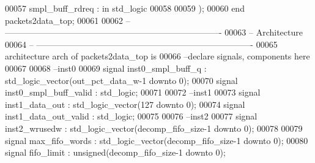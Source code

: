 \begin{DoxyCode}
00057       \textcolor{vhdlchar}{smpl_buff_rdreq}   \textcolor{vhdlchar}{:} \textcolor{keywordflow}{in} \textcolor{comment}{std\_logic}
00058       
00059         \textcolor{vhdlchar}{)};
00060 \textcolor{keywordflow}{end} \textcolor{vhdlchar}{packets2data\_top};
00061 
00062 \textcolor{keyword}{-- ----------------------------------------------------------------------------}
00063 \textcolor{keyword}{-- Architecture}
00064 \textcolor{keyword}{-- ----------------------------------------------------------------------------}
00065 \textcolor{keywordflow}{architecture} arch \textcolor{keywordflow}{of} packets2data_top is
00066 \textcolor{keyword}{--declare signals,  components here}
00067 
00068 \textcolor{keyword}{--inst0}
00069 \textcolor{keywordflow}{signal} \textcolor{vhdlchar}{inst0_smpl_buff_q}         \textcolor{vhdlchar}{:} \textcolor{comment}{std\_logic\_vector}\textcolor{vhdlchar}{(}\textcolor{vhdlchar}{out_pct_data_w}\textcolor{vhdlchar}{-}\textcolor{vhdllogic}{}\textcolor{vhdllogic}{1} \textcolor{keywordflow}{downto} \textcolor{vhdllogic}{}\textcolor{vhdllogic}{0}\textcolor{vhdlchar}{)}; 
00070 \textcolor{keywordflow}{signal} \textcolor{vhdlchar}{inst0_smpl_buff_valid}     \textcolor{vhdlchar}{:} \textcolor{comment}{std\_logic};
00071 
00072 \textcolor{keyword}{--inst1}
00073 \textcolor{keywordflow}{signal} \textcolor{vhdlchar}{inst1_data_out}            \textcolor{vhdlchar}{:} \textcolor{comment}{std\_logic\_vector}\textcolor{vhdlchar}{(}\textcolor{vhdllogic}{}\textcolor{vhdllogic}{127} \textcolor{keywordflow}{downto} \textcolor{vhdllogic}{}\textcolor{vhdllogic}{0}\textcolor{vhdlchar}{)};
00074 \textcolor{keywordflow}{signal} \textcolor{vhdlchar}{inst1_data_out_valid}      \textcolor{vhdlchar}{:} \textcolor{comment}{std\_logic};
00075 
00076 \textcolor{keyword}{--inst2}
00077 \textcolor{keywordflow}{signal} \textcolor{vhdlchar}{inst2_wrusedw}             \textcolor{vhdlchar}{:} \textcolor{comment}{std\_logic\_vector}\textcolor{vhdlchar}{(}\textcolor{vhdlchar}{decomp_fifo_size}\textcolor{vhdlchar}{-}\textcolor{vhdllogic}{}\textcolor{vhdllogic}{1} \textcolor{keywordflow}{downto} \textcolor{vhdllogic}{}\textcolor{vhdllogic}{0}\textcolor{vhdlchar}{)};
00078 
00079 \textcolor{keywordflow}{signal} \textcolor{vhdlchar}{max_fifo_words}            \textcolor{vhdlchar}{:} \textcolor{comment}{std\_logic\_vector}\textcolor{vhdlchar}{(}\textcolor{vhdlchar}{decomp_fifo_size}\textcolor{vhdlchar}{-}\textcolor{vhdllogic}{}\textcolor{vhdllogic}{1} \textcolor{keywordflow}{downto} \textcolor{vhdllogic}{}\textcolor{vhdllogic}{0}\textcolor{vhdlchar}{)};
00080 \textcolor{keywordflow}{signal} \textcolor{vhdlchar}{fifo_limit}                \textcolor{vhdlchar}{:} \textcolor{comment}{unsigned}\textcolor{vhdlchar}{(}\textcolor{vhdlchar}{decomp_fifo_size}\textcolor{vhdlchar}{-}\textcolor{vhdllogic}{}\textcolor{vhdllogic}{1} \textcolor{keywordflow}{downto} \textcolor{vhdllogic}{}\textcolor{vhdllogic}{0}\textcolor{vhdlchar}{)};

\end{DoxyCode}
